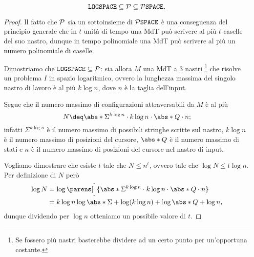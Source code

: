 \begin{theorem}
    \[
        \LOGSPACE \subseteq \P \subseteq \PSPACE.
    \]
\end{theorem}
\begin{proof}
    Il fatto che $\P$ sia un sottoinsieme di $\PSPACE$ è una conseguenza del principio
    generale che in $t$ unità di tempo una MdT può scrivere al più $t$ caselle del suo nastro,
    dunque in tempo polinomiale una MdT può scrivere al più un numero polinomiale di caselle.

    Dimostriamo che $\LOGSPACE \subseteq \P$: sia allora $M$ una MdT a $3$ nastri
    \footnote{Se fossero più nastri basterebbe dividere ad un certo punto per un'opportuna costante.}
    che risolve un problema $I$ in spazio logaritmico, ovvero la lunghezza massima del
    singolo nastro di lavoro è al più $k\log n$, dove $n$ è la taglia dell'input.
    
    Segue che il numero massimo di configurazioni attraversabili da $M$ è al più \[
        N \deq \abs*{\Sigma}^{k\log n} \cdot k\log n \cdot \abs*{Q} \cdot n;
    \] infatti ${\Sigma}^{k\log n}$ è il numero massimo di possibili stringhe scritte sul nastro,
    $k\log n$ è il numero massimo di posizioni del cursore,
    $\abs*{Q}$ è il numero massimo di stati e 
    $n$ è il numero massimo di posizioni del cursore nel nastro di input.

    Vogliamo dimostrare che esiste $t$ tale che $N \leq n^t$, ovvero tale che $\log{N} \leq t \log n$. Per definizione di $N$ però \begin{align*}
        \log N 
        &= \log \parens[\Big]{\abs*{\Sigma}^{k\log n} \cdot k\log n \cdot \abs*{Q} \cdot n}\\
        &= k\log n\log \abs*{\Sigma} + \log (k\log n) + \log \abs*{Q} + \log n,
    \end{align*} dunque dividendo per $\log n$ otteniamo un possibile valore di $t$.
\end{proof}